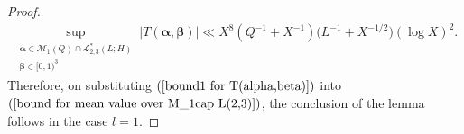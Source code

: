 \documentclass{amsart}%
\numberwithin{equation}{section}
\theoremstyle{remark}
\newcommand{\1}{\mathbbm{1}}
\begin{document}
\begin{proof}
\begin{equation}\label{bound1 for T(alpha,beta)}
\begin{aligned}
    \sup_{\substack{\boldsymbol{\alpha}\in \mathcal{M}_1(Q)\cap \mathcal{L}^*_{2,3}(L;H)\\ \boldsymbol{\beta}\in [0,1)^3 }} |T(\boldsymbol{\alpha},\boldsymbol{\beta})|\ll X^{8}\left(Q^{-1}+X^{-1}\right)\bigl(L^{-1}+{X^{-1/2}}\bigr)(\log X)^2.
\end{aligned}
\end{equation}
Therefore, on substituting $(\ref{bound1 for T(alpha,beta)})$ into $(\ref{bound for mean value over M_1cap L(2,3)})$, the conclusion of the lemma follows in the case $l=1$. 


\end{proof}
\end{document}
